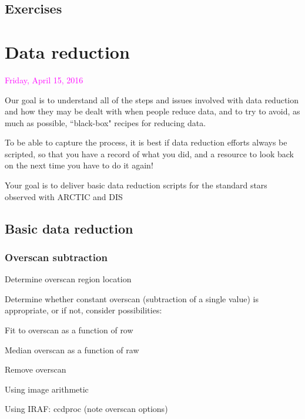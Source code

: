 \documentclass{article}
\begin{document}
\subsection*{Exercises}

\section*{Data reduction}
\textcolor{magenta}{Friday, April 15, 2016}

Our goal is to understand all of the steps and issues involved with
data reduction and how they may be dealt with when people reduce data,
and to try to avoid, as much as possible, ``black-box" recipes for
reducing data.

To be able to capture the process, it is best if data reduction
efforts always be scripted, so that you have a record of what you did,
and a resource to look back on the next time you have to do it again!

Your goal is to deliver basic data reduction scripts for the standard
stars observed with ARCTIC and DIS

\subsection*{Basic data reduction}
\subsubsection*{Overscan subtraction}
\begin{itemize*}
    \item Determine overscan region location
    \item Determine whether constant overscan (subtraction of a single value) is
        appropriate, or if not, consider possibilities:
        \begin{itemize*}
            \item Fit to overscan as a function of row
            \item Median overscan as a function of raw
        \end{itemize*}
    \item Remove overscan
        \begin{itemize*}
            \item Using image arithmetic
            \item Using IRAF: ccdproc (note overscan options)
        \end{itemize*}
\end{itemize*}
\end{document}
